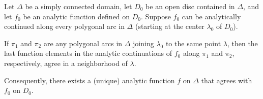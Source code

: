 Let $\Delta$ be a simply connected domain, let $D_0$ be an open disc contained in $\Delta$, and let $f_0$ be an analytic function defined on $D_0$. Suppose $f_0$ can be analytically continued along every polygonal arc in $\Delta$ (starting at the center $\lambda_0$ of $D_0$).

If $\pi_1$ and $\pi_2$ are any polygonal arcs in $\Delta$ joining $\lambda_0$ to the same point $\lambda$, then the last function elements in the analytic continuations of $f_0$ along $\pi_1$ and $\pi_2$, respectively, agree in a neighborhood of $\lambda$.

Consequently, there exists a (unique) analytic function $f$ on $\Delta$ that agrees with $f_0$ on $D_0$.
